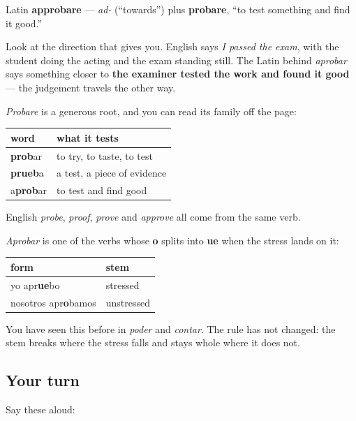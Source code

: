 \begin{cousinweb}
Latin \textbf{approbare} — \emph{ad-} (\textquotedblleft{}towards\textquotedblright{}) plus \textbf{probare}, \textquotedblleft{}to test something and find it good.\textquotedblright{}

Look at the direction that gives you. English says \emph{I passed the exam}, with the student doing the acting and the exam standing still. The Latin behind \emph{aprobar} says something closer to \textbf{the examiner tested the work and found it good} — the judgement travels the other way.

\emph{Probare} is a generous root, and you can read its family off the page:

\noindent
\begin{tabularx}{\linewidth}{@{}>{\raggedright\arraybackslash}X>{\raggedright\arraybackslash}X@{}}
\toprule
\textbf{word} & \textbf{what it tests} \\
\midrule
\textbf{prob}ar & to try, to taste, to test \\
\textbf{prueb}a & a test, a piece of evidence \\
a\textbf{prob}ar & to test and find good \\
\bottomrule
\end{tabularx}

English \emph{probe}, \emph{proof}, \emph{prove} and \emph{approve} all come from the same verb.
\end{cousinweb}

\begin{grammarlens}[title={Grammar Lens: the vowel that breaks in the middle}]
\emph{Aprobar} is one of the verbs whose \textbf{o} splits into \textbf{ue} when the stress lands on it:

\noindent
\begin{tabularx}{\linewidth}{@{}>{\raggedright\arraybackslash}X>{\raggedright\arraybackslash}X@{}}
\toprule
\textbf{form} & \textbf{stem} \\
\midrule
yo apr\textbf{ue}bo & stressed \\
nosotros apr\textbf{o}bamos & unstressed \\
\bottomrule
\end{tabularx}

You have seen this before in \emph{poder} and \emph{contar}. The rule has not changed: the stem breaks where the stress falls and stays whole where it does not.
\end{grammarlens}

\subsection*{Your turn}
Say these aloud:

